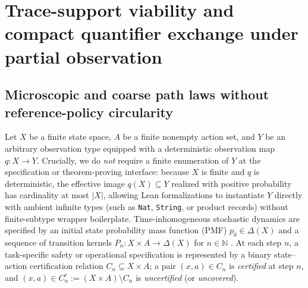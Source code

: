 \documentclass[11pt,a4paper]{article}
\newcounter{none}
\begin{document}
\section{Trace-support viability and compact quantifier exchange under
partial
observation}\label{trace-support-viability-and-compact-quantifier-exchange-under-partial-observation}

\subsection{Microscopic and coarse path laws without reference-policy
circularity}\label{microscopic-and-coarse-path-laws-without-reference-policy-circularity}

Let \(X\) be a finite state space, \(A\) be a finite nonempty action
set, and \(Y\) be an arbitrary observation type equipped with a
deterministic observation map \(q: X \to Y\). Crucially, we do
\emph{not} require a finite enumeration of \(Y\) at the specification or
theorem-proving interface: because \(X\) is finite and \(q\) is
deterministic, the effective image \(q(X) \subseteq Y\) realized with
positive probability has cardinality at most \(|X|\), allowing Lean
formalizations to instantiate \(Y\) directly with ambient infinite types
(such as \texttt{Nat}, \texttt{String}, or product records) without
finite-subtype wrapper boilerplate. Time-inhomogeneous stochastic
dynamics are specified by an initial state probability mass function
(PMF) \(p_0 \in \Delta(X)\) and a sequence of transition kernels
\(P_n: X \times A \to \Delta(X)\) for \(n \in \mathbb{N}\)
\citep{paz1971, puterman1994}. At each step \(n\), a task-specific
safety or operational specification is represented by a binary
state--action certification relation \(C_n \subseteq X \times A\); a
pair \((x,a) \in C_n\) is \emph{certified} at step \(n\), and
\((x,a) \in C_n^c := (X \times A) \setminus C_n\) is \emph{uncertified}
(or \emph{uncovered}).
\end{document}
